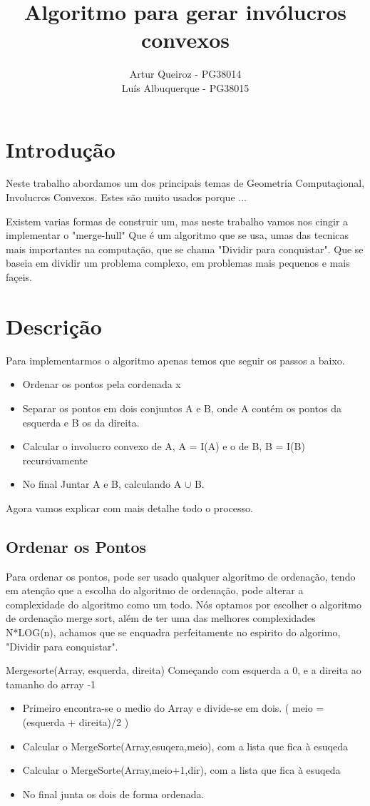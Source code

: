 \documentclass[11pt]{article}
\title{Algoritmo para gerar invólucros convexos}
\author{Artur Queiroz - PG38014\\Luís Albuquerque - PG38015}
\begin{document}
\maketitle

\section{Introdução}
Neste trabalho abordamos um dos principais temas de Geometria 
Computaçional, Involucros Convexos.
Estes são muito usados porque ...

Existem varias formas de construir um, mas neste trabalho vamos
nos cingir a implementar o "merge-hull"
Que é um algoritmo que se usa, umas das tecnicas mais importantes
na computação, que se chama "Dividir para conquistar".
Que se baseia em dividir um problema complexo, em problemas mais 
pequenos e mais façeis.

\section{Descrição}
Para implementarmos o algoritmo apenas temos que seguir os passos
a baixo.

\begin{itemize}
    \item Ordenar os pontos pela cordenada x
    \item Separar os pontos em dois conjuntos A e B, onde A contém os pontos da esquerda e B os da direita.
    \item Calcular o involucro convexo de A, A = I(A) e o de B, B = I(B) recursivamente
    \item No final Juntar A e B, calculando A $\cup$ B.
\end{itemize}

Agora vamos explicar com mais detalhe todo o processo.
\subsection{ Ordenar os Pontos }
Para ordenar os pontos, pode ser usado qualquer algoritmo de ordenação,
tendo em atenção que a escolha do algoritmo de ordenação, pode alterar a
complexidade do algoritmo como um todo.
Nós optamos por escolher o algoritmo de ordenação merge sort,
além de ter uma das melhores complexidades N*LOG(n), achamos 
que se enquadra perfeitamente no espirito do algorimo, "Dividir para conquistar".

Mergesorte(Array, esquerda, direita)
Começando com esquerda a 0, e a direita ao tamanho do array -1
\begin{itemize}
    \item Primeiro encontra-se o medio do Array e divide-se em dois. ( meio = (esquerda + direita)/2 )
    \item Calcular o MergeSorte(Array,esuqera,meio), com a lista que fica à esuqeda 
    \item Calcular o MergeSorte(Array,meio+1,dir), com a lista que fica à esuqeda 
    \item No final junta os dois de forma ordenada.
\end{itemize}
\end{document}
